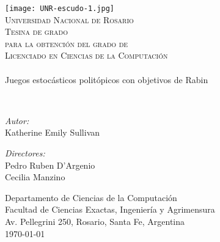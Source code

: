 {%
\thispagestyle{empty}
\begin{center}
	\texttt{[image: UNR-escudo-1.jpg]}
	\\[0.5cm]
	\textsc{\LARGE Universidad Nacional de Rosario}\\[1.5cm]

	\textsc{{\Large Tesina de grado} \\ para la obtención del grado de \\
		Licenciado en Ciencias de la Computaci\'on}\\[0.5cm]
	\HRule{} \\[0.4cm] %
	{\huge Juegos estocásticos politópicos con objetivos de Rabin
	\\[0.4cm]}

	\HRule{} \\[0.4cm] %
	\noindent
	\begin{minipage}{0.4\textwidth}
		\begin{flushleft} \large
			\emph{Autor:}\\
			Katherine Emily Sullivan
		\end{flushleft}
	\end{minipage}%
	\begin{minipage}{0.4\textwidth}
		\begin{flushright} \large
			\emph{Directores:} \\
			Pedro Ruben D'Argenio \\
			Cecilia Manzino \\
		\end{flushright}
	\end{minipage}

	\vfill

	Departamento de Ciencias de la Computación\\ Facultad de Ciencias Exactas,
	Ingeniería y Agrimensura\\ Av. Pellegrini 250, Rosario, Santa Fe, Argentina\\[0.4cm]
	{\large \today}

\end{center}
\clearpage
}
